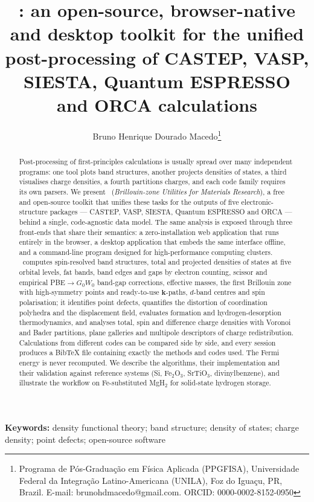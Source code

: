 \documentclass[11pt,a4paper]{article}
\title{\BMR: an open-source, browser-native and desktop toolkit for the unified post-processing of CASTEP, VASP, SIESTA, Quantum ESPRESSO and ORCA calculations}
\author{Bruno Henrique Dourado Macedo\thanks{Programa de P\'os-Gradua\c{c}\~ao em F\'isica Aplicada (PPGFISA), Universidade Federal da Integra\c{c}\~ao Latino-Americana (UNILA), Foz do Igua\c{c}u, PR, Brazil. E-mail: brunohdmacedo@gmail.com. ORCID: 0000-0002-8152-0950}}
\date{}
\begin{document}
\maketitle
\begin{abstract}Post-processing of first-principles calculations is usually spread over many independent programs: one tool plots band structures, another projects densities of states, a third visualises charge densities, a fourth partitions charges, and each code family requires its own parsers. We present \BMR\ (\emph{Brillouin-zone Utilities for Materials Research}), a free and open-source toolkit that unifies these tasks for the outputs of five electronic-structure packages — CASTEP, VASP, SIESTA, Quantum ESPRESSO and ORCA — behind a single, code-agnostic data model. The same analysis is exposed through three front-ends that share their semantics: a zero-installation web application that runs entirely in the browser, a desktop application that embeds the same interface offline, and a command-line program designed for high-performance computing clusters. \BMR\ computes spin-resolved band structures, total and projected densities of states at five orbital levels, fat bands, band edges and gaps by electron counting, scissor and empirical PBE$\to G_0W_0$ band-gap corrections, effective masses, the first Brillouin zone with high-symmetry points and ready-to-use $\bm k$-paths, $d$-band centres and spin polarisation; it identifies point defects, quantifies the distortion of coordination polyhedra and the displacement field, evaluates formation and hydrogen-desorption thermodynamics, and analyses total, spin and difference charge densities with Voronoi and Bader partitions, plane galleries and multipole descriptors of charge redistribution. Calculations from different codes can be compared side by side, and every session produces a BibTeX file containing exactly the methods and codes used. The Fermi energy is never recomputed. We describe the algorithms, their implementation and their validation against reference systems (Si, Fe$_2$O$_3$, SrTiO$_3$, divinylbenzene), and illustrate the workflow on Fe-substituted MgH$_2$ for solid-state hydrogen storage.\end{abstract}
\noindent\textbf{Keywords:} density functional theory; band structure; density of states; charge density; point defects; open-source software\par\medskip
\linenumbers









\end{document}
